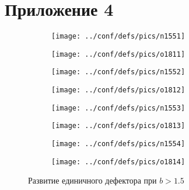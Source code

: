 \documentclass[12pt,a4paper]{article}
\begin{document}
\section{Приложение 4}	
\begin{figure}[H]
	
	\begin{subfigure}{.5\textwidth}
		\caption{}
		\label{fig:n1351}
		\texttt{[image: ../conf/defs/pics/n1551]}
	\end{subfigure}%
	\begin{subfigure}{.5\textwidth}
		\caption{}
		\label{fig:o1351}
		\texttt{[image: ../conf/defs/pics/o1811]}
	\end{subfigure}%
	
	\begin{subfigure}{.5\textwidth}
		\caption{}
		\label{fig:n1351}
		\texttt{[image: ../conf/defs/pics/n1552]}
	\end{subfigure}%
	\begin{subfigure}{.5\textwidth}
		\caption{}
		\label{fig:n1351}
		\texttt{[image: ../conf/defs/pics/o1812]}
	\end{subfigure}%
	
	\begin{subfigure}{.5\textwidth}
		\caption{}
		\label{fig:n1351}
		\texttt{[image: ../conf/defs/pics/n1553]}
	\end{subfigure}%
	\begin{subfigure}{.5\textwidth}
		\caption{}
		\label{fig:n1351}
		\texttt{[image: ../conf/defs/pics/o1813]}
	\end{subfigure}%
	
	\begin{subfigure}{.5\textwidth}
		\caption{}
		\label{fig:n1351}
		\texttt{[image: ../conf/defs/pics/n1554]}
	\end{subfigure}%
	\begin{subfigure}{.5\textwidth}
		\caption{}
		\label{fig:n1351}
		\texttt{[image: ../conf/defs/pics/o1814]}
	\end{subfigure}%

	\caption{Развитие единичного дефектора при $b>1.5$}
	
\end{figure}
\end{document}
